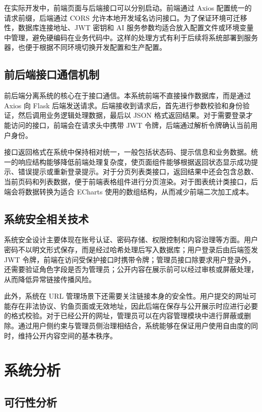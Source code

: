 \documentclass[12pt,a4paper]{ctexart}
\begin{document}
在实际开发中，前端页面与后端接口可以分别启动。前端通过 Axios 配置统一的请求前缀，后端通过 CORS 允许本地开发域名访问接口。为了保证环境可迁移性，数据库连接地址、JWT 密钥和 AI 服务参数均适合放入配置文件或环境变量中管理，避免硬编码在业务代码中。这样的处理方式有利于后续将系统部署到服务器，也便于根据不同环境切换开发配置和生产配置。

\subsection{前后端接口通信机制}
前后端分离系统的核心在于接口通信。本系统前端不直接操作数据库，而是通过 Axios 向 Flask 后端发送请求。后端接收到请求后，首先进行参数校验和身份验证，然后调用业务逻辑处理数据，最后以 JSON 格式返回结果。对于需要登录才能访问的接口，前端会在请求头中携带 JWT 令牌，后端通过解析令牌确认当前用户身份。

接口返回格式在系统中保持相对统一，一般包括状态码、提示信息和业务数据。统一的响应结构能够降低前端处理复杂度，使页面组件能够根据返回状态显示成功提示、错误提示或重新登录提示。对于分页列表类接口，返回结果中还会包含总数、当前页码和列表数据，便于前端表格组件进行分页渲染。对于图表统计类接口，后端会将数据转换为适合 ECharts 使用的数组结构，从而减少前端二次加工成本。

\subsection{系统安全相关技术}
系统安全设计主要体现在账号认证、密码存储、权限控制和内容治理等方面。用户密码不以明文形式保存，而是经过哈希处理后写入数据库；用户登录后由后端签发 JWT 令牌，前端在访问受保护接口时携带令牌；管理员接口除要求用户登录外，还需要验证角色字段是否为管理员；公开内容在展示前可以经过审核或屏蔽处理，从而降低异常链接传播风险。

此外，系统在 URL 管理场景下还需要关注链接本身的安全性。用户提交的网址可能存在非法协议、钓鱼页面或无效地址，因此后端在保存与公开展示时应进行必要的格式校验。对于已经公开的网址，管理员可以在内容管理模块中进行屏蔽或删除。通过用户侧约束与管理员侧治理相结合，系统能够在保证用户使用自由度的同时，维持公开内容空间的基本秩序。

\clearpage
\section{系统分析}

\subsection{可行性分析}
\end{document}
